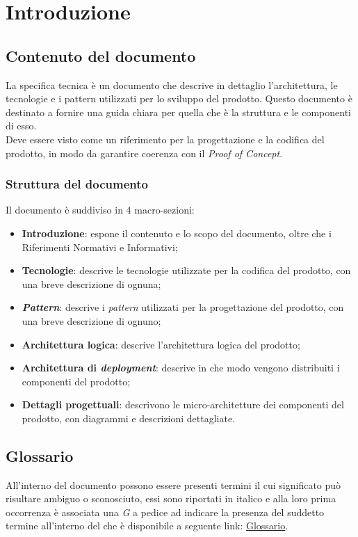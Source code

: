\section{Introduzione}

\subsection{Contenuto del documento}

La specifica tecnica è un documento che descrive in dettaglio l'architettura, le tecnologie e i pattern utilizzati 
per lo sviluppo del prodotto. Questo documento è destinato a fornire una guida chiara per quella che è la struttura 
e le componenti di esso. \\
Deve essere visto come un riferimento per la progettazione e la codifica del prodotto, in modo da garantire coerenza 
con il \textit{Proof of Concept}.

\subsubsection{Struttura del documento}

Il documento è suddiviso in 4 macro-sezioni:

\begin{itemize}
    \item \textbf{Introduzione}: espone il contenuto e lo scopo del documento, oltre che i Riferimenti Normativi e Informativi;
    \item \textbf{Tecnologie}: descrive le tecnologie utilizzate per la codifica del prodotto, con una breve descrizione di ognuna;
    \item \textbf{\textit{Pattern}}: descrive i \textit{pattern} utilizzati per la progettazione del prodotto, con una breve descrizione di ognuno;
    \item \textbf{Architettura logica}: descrive l'architettura logica del prodotto;
    \item \textbf{Architettura di \textit{deployment}}: descrive in che modo vengono distribuiti i componenti del prodotto;
    \item \textbf{Dettagli progettuali}: descrivono le micro-architetture dei componenti del prodotto, con diagrammi e descrizioni dettagliate.
\end{itemize}

\subsection{Glossario}
All'interno del documento possono essere presenti termini il cui significato può risultare ambiguo o sconosciuto, essi sono 
riportati in italico e alla loro prima occorrenza è associata una \textit{G} a pedice ad indicare la presenza del suddetto termine 
all'interno del  che è disponibile a seguente link: \href{https://snakebyteteam.github.io/glossary.html}{Glossario}.


